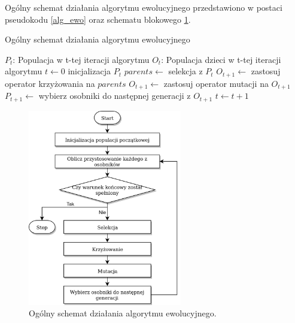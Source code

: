 Ogólny schemat działania algorytmu ewolucyjnego przedstawiono w postaci pseudokodu \ref{alg_ewo} oraz schematu blokowego \ref{alg_ewo_img}.

\begin{pseudokod}[H]
\label{alg_ewo}
    \caption{Ogólny schemat działania algorytmu ewolucyjnego}
    $P_t$: Populacja w t-tej iteracji algorytmu\;
    $O_t$: Populacja dzieci w t-tej iteracji algorytmu\;
    \BlankLine
    $t \gets 0$\;
    inicjalizacja $P_t$\;
    \BlankLine
     {
        $parents \gets$ selekcja z $P_t$\;
        $O_{t+1} \gets$ zastosuj operator krzyżowania na $parents$\;
        $O_{t+1} \gets$ zastosuj operator mutacji na $O_{t+1}$\;
        $P_{t+1} \gets$ wybierz osobniki do następnej generacji z $O_{t+1}$\;
        $t \gets t+1$\;
    }
    \;
\end{pseudokod}

\begin{figure}[H]
    \centering        
    \includegraphics[width=0.6\textwidth]{img/alg_ewo_szkic.png}
    \caption{Ogólny schemat działania algorytmu ewolucyjnego.}
    \label{alg_ewo_img}
\end{figure}

